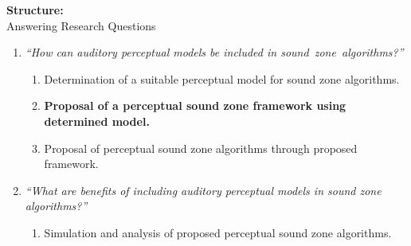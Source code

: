 \documentclass[aspectratio=169]{beamer}
\begin{document}
\begin{frame}{\textbf{Structure:}\\ Answering Research Questions}
    \begin{enumerate}
        \item {\textit{``How can auditory perceptual models be included in sound~zone~algorithms?''}}
            \vspace{7pt}
            \begin{enumerate}
                \item Determination of a suitable perceptual model for sound zone algorithms.
                \vspace{7pt}
                \item \textbf{Proposal of a perceptual sound zone framework using determined model.}
                \vspace{7pt}
                \item Proposal of perceptual sound zone algorithms through proposed framework.
                \vspace{7pt}
            \end{enumerate}
        \item {\textit{``What are benefits of including auditory perceptual models in sound zone algorithms?''}}
            \vspace{-5pt}
            \begin{enumerate}
                \item Simulation and analysis of proposed perceptual sound zone algorithms.
            \end{enumerate}
    \end{enumerate}
\end{frame}
\end{document}
